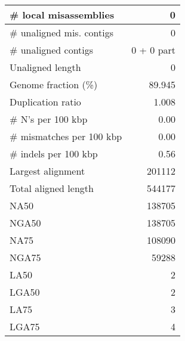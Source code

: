 \documentclass[12pt,a4paper]{article}
\begin{document}
\begin{table}[ht]
\begin{center}
\begin{tabular}{|l*{1}{|r}|}
\# local misassemblies & 0 \\ \hline
\# unaligned mis. contigs & 0 \\ \hline
\# unaligned contigs & 0 + 0 part \\ \hline
Unaligned length & 0 \\ \hline
Genome fraction (\%) & 89.945 \\ \hline
Duplication ratio & 1.008 \\ \hline
\# N's per 100 kbp & 0.00 \\ \hline
\# mismatches per 100 kbp & 0.00 \\ \hline
\# indels per 100 kbp & 0.56 \\ \hline
Largest alignment & 201112 \\ \hline
Total aligned length & 544177 \\ \hline
NA50 & 138705 \\ \hline
NGA50 & 138705 \\ \hline
NA75 & 108090 \\ \hline
NGA75 & 59288 \\ \hline
LA50 & 2 \\ \hline
LGA50 & 2 \\ \hline
LA75 & 3 \\ \hline
LGA75 & 4 \\ \hline
\end{tabular}
\end{center}
\end{table}
\end{document}
